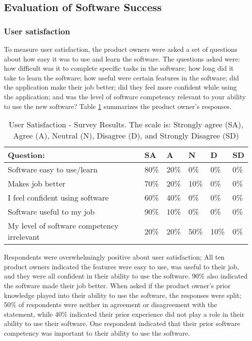 \subsection{Evaluation of Software Success}
\subsubsection{User satisfaction}
To measure user satisfaction, the product owners were asked a set of questions about how easy it was to use and learn the software. The questions asked were: how difficult was it to complete specific tasks in the software; how long did it take to learn the software; how useful were certain features in the software; did the application make their job better;  did they feel more confident while using the application; and was the level of software competency relevant to your ability to use the new software? Table \ref{table:usersatisfaction} summarizes the product owner's responses. 

\begin{table}
\caption{User Satisfaction - Survey Results. The scale is: Strongly agree (SA), Agree (A), Neutral (N), Disagree (D), and Strongly Disagree (SD)}
\label{table:usersatisfaction}
\begin{tabular}{p{4.3cm}p{.4cm}p{.4cm}p{.38cm}p{.4cm}p{.4cm}}
Question: & SA & A & N & D & SD \\
 \hline
Software easy to use/learn & 80\% & 20\% & 0\% & 0\% & 0\% \\
Makes job better & 70\% & 20\% & 10\% & 0\% & 0\% \\
I feel confident using software & 60\% & 40\% & 0\% & 0\% & 0\% \\
Software useful to my job & 90\% & 10\% & 0\% & 0\% & 0\% \\
My level of software competency irrelevant & 20\% & 20\% & 50\% & 10\% & 0\% \\
\end{tabular}
\end{table}

Respondents were overwhelmingly positive about user satisfaction; All ten product owners indicated the features were easy to use, was useful to their job, and they were all confident in their ability to use the software. 90\% also indicated the software made their job better. When asked if the product owner's prior knowledge played into their ability to use the software, the responses were split; 50\% of respondents were neither in agreement or disagreement with the statement, while 40\% indicated their prior experience did not play a role in their ability to use their software. One respondent indicated that their prior software competency was important to their ability to use the software.

